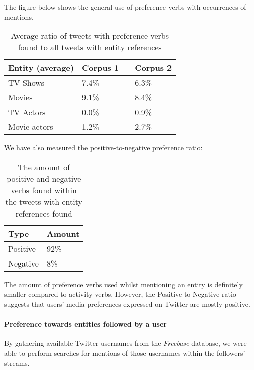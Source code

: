 The figure below shows the general use of preference verbs with occurrences of
mentions.

\begin{table}[h!]
  \begin{center}
    \begin{tabular}{ | p{4cm} | p{2cm} | p{1cm}| p{2cm} | } \hline
      Entity (average) & Corpus 1 & & Corpus 2 \\ \hline
      TV Shows & 7.4\% & & 6.3\% \\ \hline
      Movies & 9.1\% & & 8.4\% \\ \hline
      TV Actors & 0.0\% & & 0.9\% \\ \hline
      Movie actors & 1.2\% & & 2.7\% \\ \hline
    \end{tabular}
    \caption{Average ratio of tweets with preference verbs found to all tweets with entity references}
  \end{center}
\end{table}

We have also measured the positive-to-negative preference ratio:

\begin{table}[h!]
  \begin{center}
  \begin{tabular}{ | p{3cm}| p{2cm} | } \hline
    Type & Amount \\ \hline
    Positive & 92\% \\ \hline
    Negative & 8\% \\ \hline
  \end{tabular}
  \caption{The amount of positive and negative verbs found within the tweets with entity references found}
  \end{center}
\end{table}

The amount of preference verbs used whilst mentioning an entity is definitely
smaller compared to activity verbs. However, the Positive-to-Negative ratio suggests that users'
media preferences expressed on Twitter are mostly positive.

\paragraph{Preference towards entities followed by a user}
By gathering available Twitter usernames from the \textit{Freebase} database,
we were able to perform searches for mentions of those usernames within the followers' streams.

